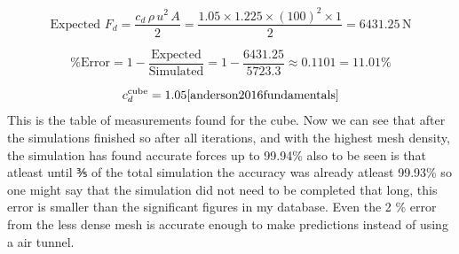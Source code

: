 \documentclass[12pt,a4paper]{article}
\begin{document}
\begin{table}[H]
\centering
\caption{Full data collected for the cube simulation}
\label{tab:cube_results}
\end{table}
\[
\text{Expected }  F_d = \frac{c_d \, \rho \, u^2 \, A}{2} = \frac{1.05 \times 1.225 \times (100)^2 \times 1}{2} = 6431.25 \, \text{N}
\]

\[
\text{\% Error} = 1 - \frac{\text{Expected}}{\text{Simulated}} = 1 - \frac{6431.25}{5723.3} \approx 0.1101 = 11.01\%
\]

\[
c_d^{\text{cube}} = 1.05 \cite{anderson2016fundamentals}
\]
This is the table of measurements found for the cube. Now we can see that  after the simulations finished so after all iterations, and with the highest mesh density, the simulation has found accurate forces up to 99.94\% also to be seen is that atleast until ⅗ of the total simulation the accuracy was already atleast 99.93\% so one might say that the simulation did not need to be completed that long, this error is smaller than the significant figures in my database. Even the 2 \% error from the less dense mesh is accurate enough to make predictions instead of using a air tunnel. 
\end{document}
